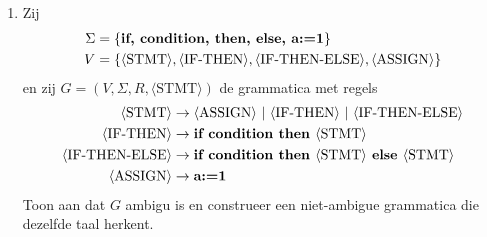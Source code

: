 \documentclass[a4paper]{article}
\newcommand{\rul}{\rightarrow}
\newcommand{\gvar}[1]{\langle \text{{#1}} \rangle}
\newcommand{\gend}[1]{\text{\bf{#1}}}
\begin{document}
\begin{enumerate}
   \item Zij 
   \begin{align*}
      \Sigma & = \{ \gend{if, condition, then, else, a:=1} \} \\
      V & = \{ \gvar{STMT}, \gvar{IF-THEN}, \gvar{IF-THEN-ELSE}, \gvar{ASSIGN} \} \\
   \end{align*}
      en zij $G = (V,\Sigma,R,\gvar{STMT})$ de grammatica met regels
      \begin{align*}                                                                               
         \gvar{STMT}          & \rul \gvar{ASSIGN} \ | \ \gvar{IF-THEN} \ | \ \gvar{IF-THEN-ELSE}  \\
         \gvar{IF-THEN}       & \rul \gend{if condition then } \gvar{STMT} \\
         \gvar{IF-THEN-ELSE}  & \rul \gend{if condition then } \gvar{STMT} \gend{ else } \gvar{STMT} \\
         \gvar{ASSIGN}        & \rul \gend{a:=1} \\
      \end{align*}
      Toon aan dat $G$ ambigu is en construeer een niet-ambigue grammatica die dezelfde taal herkent. 
\end{enumerate}
\end{document}
